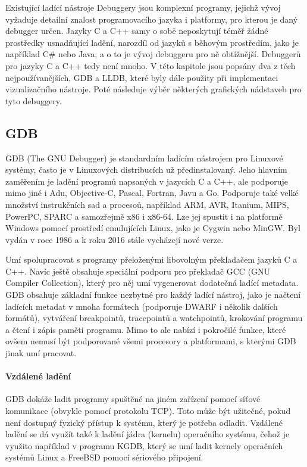 \documentclass[czech,bachelor,male,python,dept460]{diploma}						%
\newcommand{\parspace}[1][]{
	\ifthenelse{\isempty{#1}}{\vspace{5mm}}{\vspace{#1}}
	\par
}
\begin{document}
\begin{section}{Existující ladící nástroje}
\label{sec:ExistingDebuggers}
	Debuggery jsou komplexní programy, jejichž vývoj vyžaduje detailní znalost programovacího jazyka i platformy, pro kterou je daný debugger určen.
	Jazyky C a C++ samy o sobě neposkytují téměř žádné prostředky usnadňující ladění, narozdíl od jazyků s běhovým prostředím, jako je například C\# nebo Java,
	a o to je vývoj debuggeru pro ně obtížnější. Debuggerů pro jazyky C a C++ tedy není mnoho. V této kapitole jsou popsány dva z těch nejpoužívanějších,
	GDB a LLDB, které byly dále použity při implementaci vizualizačního nástroje. Poté následuje výběr některých grafických nádstaveb pro tyto debuggery.

	\subsection{GDB}
		GDB (The GNU Debugger) je standardním ladícím nástrojem pro Linuxové systémy, často je v Linuxových distribucích už předinstalovaný.
		Jeho hlavním zaměřením je ladění programů napsaných v jazycích C a C++, ale podporuje mimo jiné i Adu, Objective-C, Pascal, Fortran, Javu
		a Go. \cite{gdb-languages} Podporuje také velké množství instrukčních sad a procesoů, například ARM, AVR, Itanium, MIPS, PowerPC, SPARC a
		samozřejmě x86 i x86-64. Lze jej spustit i na platformě Windows pomocí prostředí emulujících Linux, jako je Cygwin nebo MinGW.
		Byl vydán v roce 1986 a k roku 2016 stále vycházejí nové verze.
		
		\parspace Umí spolupracovat s programy přeloženými libovolným překladačem jazyků C a C++. Navíc ještě obsahuje
		speciální podporu pro překladač GCC (GNU Compiler Collection), který pro něj umí vygenerovat dodatečná ladící metadata.
		GDB obsahuje základní funkce nezbytné pro každý ladící nástroj, jako je načtení ladících metadat v mnoha formátech (podporuje DWARF i několik dalších
		formátů), vytváření breakpointů, tracepointů a watchpointů, krokování programu a čtení i zápis paměti programu.
		Mimo to ale nabízí i pokročilé funkce, které ovšem nemusí být podporované všemi procesory a platformami, s kterými GDB jinak umí pracovat.
		
		\paragraph*{Vzdálené ladění}
			GDB dokáže ladit programy spuštěné na jiném zařízení pomocí síťové komunikace (obvykle pomocí protokolu TCP).
			Toto může být užitečné, pokud není dostupný fyzický přístup k systému, který je potřeba odladit.
			Vzdálené ladění se dá využít také k ladění jádra (kernelu) operačního systému, čehož je využito například v programu KGDB, který se umí ladit
			kernely operačních systémů Linux a FreeBSD pomocí sériového připojení.

\end{section}
\end{document}
